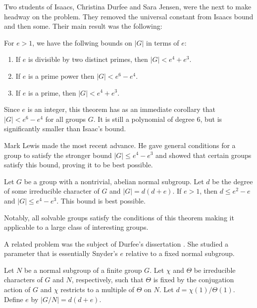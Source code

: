 \documentclass[main.tex]{subfiles}
\begin{document}
Two students of Isaacs, Christina Durfee and Sara Jensen, were the next to make headway on the problem. They removed the universal constant from Isaacs bound and then some. Their main result was the following:

\hss

\begin{theorem}
For $e > 1$, we have the follwing bounds on $|G|$ in terms of $e$:
\begin{enumerate}
	\item If $e$ is divisible by two distinct primes, then $|G| < e^4 + e^3$.
	\item If $e$ is a prime power then $|G| < e^6 - e^4$.
	\item If $e$ is a prime, then $|G| < e^4 + e^3$.
\end{enumerate}
\end{theorem}

\hss

\noindent Since $e$ is an integer, this theorem has as an immediate corollary that $|G| < e^6 - e^4$ for all groups $G$. It is still a polynomial of degree 6, but is significantly smaller than Isaac's bound.

Mark Lewis made the most recent advance. He gave general conditions \cite{lewisarticle} for a group to satisfy the stronger bound $|G| \le e^4 - e^3$ and showed that certain groups satisfy this bound, proving it to be best possible.

\hss

\begin{theorem} Let $G$ be a group with a nontrivial, abelian normal subgroup. Let $d$ be the degree of some irreducible character of $G$ and $|G| = d(d+e)$. If $e > 1$, then $d \le e^2 - e$ and $|G| \le e^4 - e^3$. This bound is best possible.
\end{theorem}

\hss

\noindent Notably, all solvable groups satisfy the conditions of this theorem making it applicable to a large class of interesting groups.

A related problem was the subject of Durfee's dissertation \cite{durfeedissertation}. She studied a parameter that is essentially Snyder's $e$ relative to a fixed normal subgroup.

\hss

\begin{definition}
Let $N$ be a normal subgroup of a finite group $G$. Let $\chi$ and $\Theta$ be irreducible characters of $G$ and $N$, respectively, such that $\Theta$ is fixed by the conjugation action of $G$ and $\chi$ restricts to a multiple of $\Theta$ on $N$. Let $d = \chi(1)/\Theta(1)$. Define $e$ by $|G/N| = d(d+e)$.
\end{definition}
\end{document}
